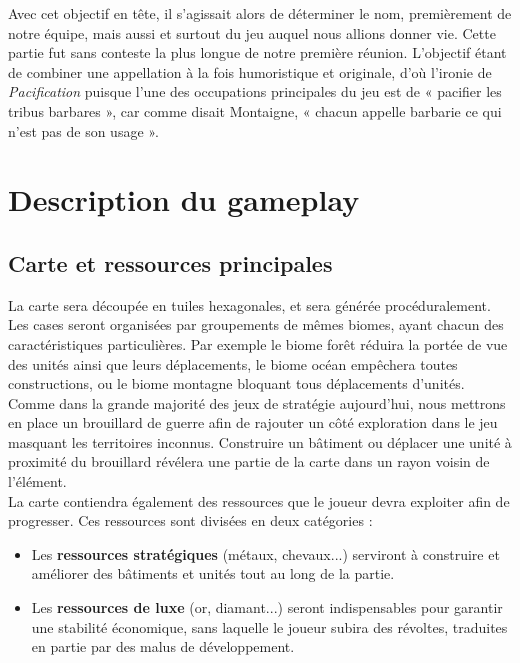 \documentclass[12pt]{report}
\begin{document}
Avec cet objectif en tête, il s’agissait alors de déterminer le nom, premièrement de notre équipe, mais aussi et surtout du jeu auquel nous allions donner vie. Cette partie fut sans conteste la plus longue de notre première réunion. L’objectif étant de combiner une appellation à la fois humoristique et originale, d’où l’ironie de \textit{Pacification} puisque l’une des occupations principales du jeu est de « pacifier les tribus barbares », car comme disait Montaigne, « chacun appelle barbarie ce qui n’est pas de son usage ».

\chapter{Description du gameplay}

\section{Carte et ressources principales}

La carte sera découpée en tuiles hexagonales, et sera générée procéduralement. Les cases seront organisées par groupements de mêmes biomes, ayant chacun des caractéristiques particulières. Par exemple le biome forêt réduira la portée de vue des unités ainsi que leurs déplacements, le biome océan empêchera toutes constructions, ou le biome montagne bloquant tous déplacements d'unités.\\

Comme dans la grande majorité des jeux de stratégie aujourd'hui, nous mettrons en place un brouillard de guerre afin de rajouter un côté exploration dans le jeu masquant les territoires inconnus. Construire un bâtiment ou déplacer une unité à proximité du brouillard révélera une partie de la carte dans un rayon voisin de l’élément.\\

La carte contiendra également des ressources que le joueur devra exploiter afin de progresser. Ces ressources sont divisées en deux catégories :

\begin{itemize}[label=\textbullet]
\item Les \textbf{ressources stratégiques} (métaux, chevaux...) serviront à construire et améliorer des bâtiments et unités tout au long de la partie. 
\item Les \textbf{ressources de luxe} (or, diamant...) seront indispensables pour garantir une stabilité économique, sans laquelle le joueur subira des révoltes, traduites en partie par des malus de développement.
\end{itemize}
\end{document}
